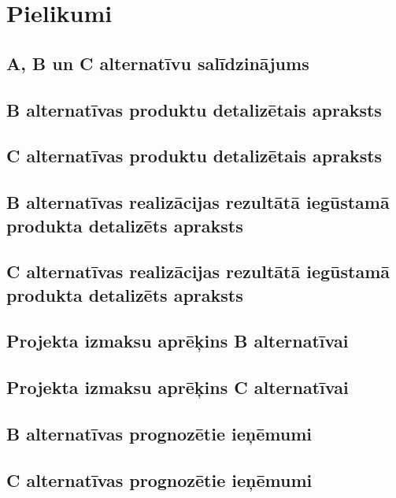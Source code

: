 \appendix
\chapter*{Pielikumi}
\renewcommand{\thesection}{\arabic{section}}
\section{A, B un C alternatīvu salīdzinājums}
\label{app:ABCsalidzinajums}
\section{B alternatīvas produktu detalizētais apraksts}
\label{app:B_detalizetais_aprkasts}
    \clearpage
\section{C alternatīvas produktu detalizētais apraksts}
\label{app:C_detalizetais_aprkasts}
    \clearpage
\section{B alternatīvas realizācijas rezultātā iegūstamā produkta detalizēts apraksts}
\label{app:B_realizacija}
    \clearpage
\section{C alternatīvas realizācijas rezultātā iegūstamā produkta detalizēts apraksts}
\label{app:C_realizacija}
    \clearpage
\section{Projekta izmaksu aprēķins B alternatīvai}
\label{app:B_izmaksas}
    \clearpage
\section{Projekta izmaksu aprēķins C alternatīvai}
\label{app:C_izmaksas}
    \clearpage
\section{B alternatīvas prognozētie ieņēmumi}
\label{app:B_ienemumi}
    \clearpage
\section{C alternatīvas prognozētie ieņēmumi}
\label{app:C_ienemumi}
    \clearpage
